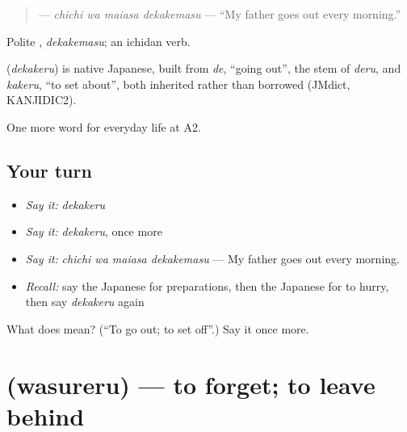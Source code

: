 \begin{quote}
\textbf{  } — \emph{chichi wa maiasa dekakemasu} — \textquotedblleft{}My father goes out every morning.\textquotedblright{}
\end{quote}

Polite \textbf{}, \emph{dekakemasu}; an ichidan verb.

\begin{cousinweb}
\textbf{} (\emph{dekakeru}) is native Japanese, built from \emph{de}, \textquotedblleft{}going out\textquotedblright{}, the stem of \emph{deru}, and \emph{kakeru}, \textquotedblleft{}to set about\textquotedblright{}, both inherited rather than borrowed (JMdict, KANJIDIC2).
\end{cousinweb}

\begin{grammarlens}[title={What you've built}]
One more word for everyday life at A2.
\end{grammarlens}

\subsection*{Your turn}
\begin{itemize}
\raggedright
  \item \emph{Say it:} \emph{dekakeru}
  \item \emph{Say it:} \emph{dekakeru}, once more
  \item \emph{Say it:} \emph{chichi wa maiasa dekakemasu} — My father goes out every morning.
  \item \emph{Recall:} say the Japanese for preparations, then the Japanese for to hurry, then say \emph{dekakeru} again
\end{itemize}

\begin{tcolorbox}[breakable,colback=teal!4,colframe=teal!35!black,title={Before you move on}]
What does  mean? (\textquotedblleft{}To go out; to set off\textquotedblright{}.) Say it once more.
\end{tcolorbox}
\section[\texorpdfstring{\ja{わすれる} (wasureru)}{わすれる (wasureru)}]{ (wasureru) — to forget; to leave behind}

\label{lesson:JA-C152-wasureru}



